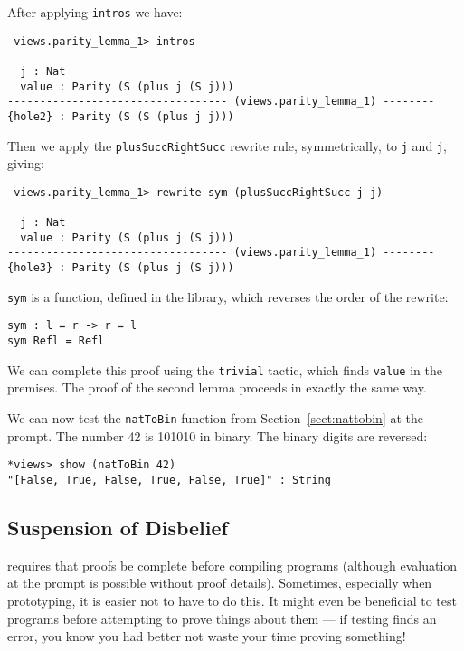 \noindent
After applying \texttt{intros} we have:

\begin{lstlisting}[style=stdout]
-views.parity_lemma_1> intros

  j : Nat
  value : Parity (S (plus j (S j)))
---------------------------------- (views.parity_lemma_1) --------
{hole2} : Parity (S (S (plus j j)))
\end{lstlisting}

\noindent
Then we apply the \texttt{plusSuccRightSucc} rewrite rule, symmetrically, to \texttt{j} and \texttt{j}, giving:

\begin{lstlisting}[style=stdout]
-views.parity_lemma_1> rewrite sym (plusSuccRightSucc j j) 

  j : Nat
  value : Parity (S (plus j (S j)))
---------------------------------- (views.parity_lemma_1) --------
{hole3} : Parity (S (plus j (S j)))
\end{lstlisting}

\noindent
\texttt{sym} is a function, defined in the library, which reverses the order of the rewrite:

\begin{lstlisting}[style=stdout]
sym : l = r -> r = l
sym Refl = Refl
\end{lstlisting} 

\noindent
We can complete this proof using the \texttt{trivial} tactic, which finds  \texttt{value} in the premises.
The proof of the second lemma proceeds in exactly the same way.

We can now test the \texttt{natToBin} function from Section~\ref{sect:nattobin} at the prompt.
The number 42 is 101010 in binary.
The binary digits are reversed:

\begin{lstlisting}[style=stdout]
*views> show (natToBin 42)
"[False, True, False, True, False, True]" : String
\end{lstlisting}


\subsection{Suspension of Disbelief}

\Idris{} requires that proofs be complete before compiling programs (although evaluation at the prompt is possible without proof details). 
Sometimes, especially when prototyping, it is easier not to have to do this.
It might even be beneficial to test programs before attempting to prove things about them --- if testing finds an error, you know you had better not waste your time proving something!

